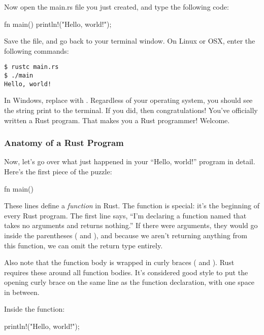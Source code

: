 \blank

Now open the main.rs file you just created, and type the following code:

\begin{rustc}
fn main() {
    println!("Hello, world!");
}
\end{rustc}

Save the file, and go back to your terminal window. On Linux or OSX, enter the following commands:

\begin{verbatim}
$ rustc main.rs
$ ./main
Hello, world!
\end{verbatim}

In Windows, replace  with . Regardless of your operating system, you should see the string 
 print to the terminal. If you did, then congratulations! You've officially written a Rust program. 
That makes you a Rust programmer! Welcome.

\subsubsection*{Anatomy of a Rust Program}

Now, let's go over what just happened in your \enquote{Hello, world!} program in detail. Here's the first piece of the puzzle:

\begin{rustc}
fn main() {
    
}
\end{rustc}

These lines define a \emph{function} in Rust. The  function is special: it's the beginning of every Rust program. The 
first line says, \enquote{I'm declaring a function named  that takes no arguments and returns nothing.} If there were 
arguments, they would go inside the parentheses (\code{(} and \code{)}), and because we aren't returning anything from this function, 
we can omit the return type entirely.

\blank

Also note that the function body is wrapped in curly braces (\code{\{} and \code{\}}). Rust requires these around all function
bodies. It's considered good style to put the opening curly brace on the same line as the function declaration, with one space 
in between.

\blank

Inside the  function:

\begin{rustc}
println!("Hello, world!");
\end{rustc}

